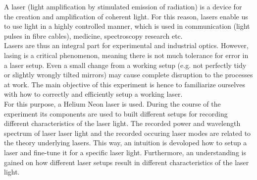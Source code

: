 \documentclass[../main.tex]{subfiles}
\begin{document}
    A laser (light amplification by stimulated emission of radiation) is a device for the creation and amplification of  coherent light. For this reason, lasers enable us to use light in a highly controlled manner, which is used in communication (light pulses in fibre cables), medicine, spectroscopy research etc.\\ 

    \noindent Lasers are thus an integral part for experimental and industrial optics. However, lasing is a critical phenomenon, meaning there is not much tolerance for error in a laser setup. Even a small change from a working setup (e.g. not perfectly tidy or slightly wrongly tilted mirrors) may cause complete disruption to the processes at work. The main objective of this experiment is hence to familiarize ourselves with how to correctly and efficiently setup a working laser.\\

    \noindent For this purpose, a Helium Neon laser is used. During the course of the experiment its components are used to built different setups for recording different characteristics of the laser light. The recorded power and wavelength spectrum of laser laser light and the recorded occuring laser modes are related to the theory underlying lasers. This way, an intuition is devoloped how to setup a laser and fine-tune it for a specific laser light. Furthermore, an understanding is gained on how different laser setups result in different characteristics of the laser light.
\end{document}
